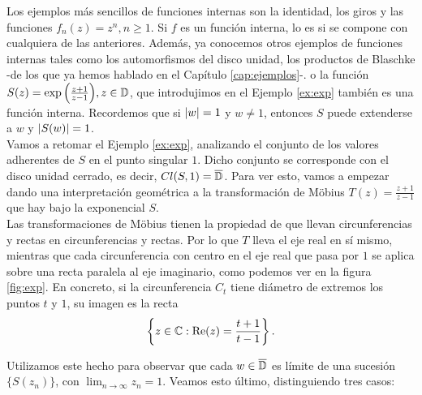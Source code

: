 \medskip

Los ejemplos más sencillos de funciones internas son la identidad, los giros y las funciones $f_n(z) = z^n, n \geq 1$. Si $f$ es un función interna, lo es si se compone con cualquiera de las anteriores.
Además, ya conocemos otros ejemplos de funciones internas tales como los automorfismos del disco unidad, los productos de Blaschke -de los que ya hemos hablado en el Capítulo \ref{cap:ejemplos}-. %
o la función $S(z) = \exp{\left(\frac{z + 1}{z - 1}\right)}, z \in \mathbb{D}$, que introdujimos en el Ejemplo \ref{ex:exp} también es una función interna. Recordemos que si $\left\lvert w\right\rvert = 1$ y $w \neq 1$, entonces $S$ puede extenderse a $w$ y $\left\lvert S(w)\right\rvert = 1$. \\


Vamos a retomar el Ejemplo \ref{ex:exp}, analizando el conjunto de los valores adherentes de $S$ en el punto singular $1$. Dicho conjunto se corresponde con el disco unidad cerrado, es decir, $Cl(S,1) = \overline{\mathbb{D}}$. Para ver esto, vamos a empezar dando una interpretación geométrica a la transformación de Möbius $T(z) = \frac{z + 1}{z - 1}$ que hay bajo la exponencial $S$. \\


Las transformaciones de Möbius tienen la propiedad de que llevan circunferencias y rectas en circunferencias y rectas. Por lo que $T$ lleva el eje real en sí mismo, mientras que cada circunferencia con centro en el eje real que pasa por $1$ se aplica sobre una recta paralela al eje imaginario, como podemos ver en la figura \ref{fig:exp}. En concreto, si la circunferencia $C_t$ tiene diámetro de extremos los puntos $t$ y $1$, su imagen es la recta
\begin{equation}
    \left\{z \in \mathbb{C} : \operatorname{Re}(z) = \frac{t + 1}{t - 1}\right\}.
\end{equation}

Utilizamos este hecho para observar que cada $w \in \overline{\mathbb{D}}$ es límite de una sucesión $\{S(z_n)\}$, con $\lim_{n \to \infty} z_n = 1$. Veamos esto último, distinguiendo tres casos:

